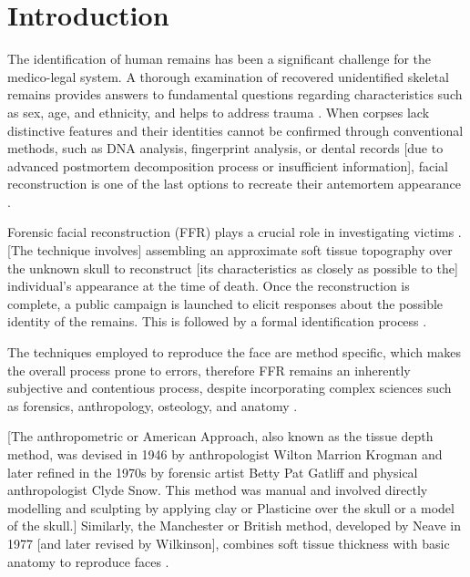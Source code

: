 \documentclass[journal,article,submit,pdftex,moreauthors]{Definitions/mdpi}
\begin{document}
\section{Introduction}
The identification of human remains has been a significant challenge for the medico-legal system. A thorough examination of recovered unidentified skeletal remains provides answers to fundamental questions regarding characteristics such as sex, age, and ethnicity, and helps to address trauma \cite{ref1}. When corpses lack distinctive features and their identities cannot be confirmed through conventional methods, such as DNA analysis, fingerprint analysis, or dental records [due to advanced postmortem decomposition process or insufficient information], facial reconstruction is one of the last options to recreate their antemortem appearance \citep{ref2,ref3,ref4,ref5}.

Forensic facial reconstruction (FFR) plays a crucial role in investigating victims \cite{ref4}. 
[The technique involves] assembling an approximate soft tissue topography over the unknown skull to reconstruct [its characteristics as closely as possible to the] individual's appearance at the time of death. Once the reconstruction is complete, a public campaign is launched to elicit responses about the possible identity of the remains. This is followed by a formal identification process \cite{ref3}.

The techniques employed to reproduce the face are method specific, which makes the overall process prone to errors, 
therefore FFR remains an inherently subjective and contentious process, despite incorporating complex sciences such as forensics, anthropology, osteology, and anatomy \cite{ref6}.

[The anthropometric or American Approach, also known as the tissue depth method, was devised in 1946 by anthropologist Wilton Marrion Krogman and later refined in the 1970s by forensic artist Betty Pat Gatliff and physical anthropologist Clyde Snow. This method was manual and involved directly modelling and sculpting by applying clay or Plasticine over the skull or a model of the skull.] Similarly, the Manchester or British method, developed by Neave in 1977 [and later revised by Wilkinson], combines soft tissue thickness with basic anatomy to reproduce faces \citep{ref7,ref8,ref9,ref10}.
\end{document}
